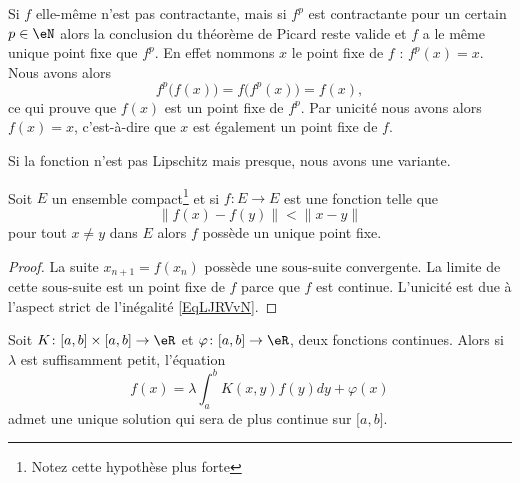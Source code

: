 \begin{remark}  \label{remIOHUJm}
	Si \( f\) elle-même n'est pas contractante, mais si \( f^p\) est contractante pour un certain \( p\in \eN\) alors la conclusion du théorème de Picard reste valide et \( f\) a le même unique point fixe que \( f^p\). En effet nommons \( x\) le point fixe de \( f\) : \( f^p(x)=x\). Nous avons alors
	\begin{equation}
		f^p\big( f(x) \big)=f\big( f^p(x) \big)=f(x),
	\end{equation}
	ce qui prouve que \( f(x)\) est un point fixe de \( f^p\). Par unicité nous avons alors \( f(x)=x\), c'est-à-dire que \( x\) est également un point fixe de \( f\).
\end{remark}

Si la fonction n'est pas Lipschitz mais presque, nous avons une variante.
\begin{proposition}
	Soit \( E\) un ensemble compact\footnote{Notez cette hypothèse plus forte} et si \( f\colon E\to E\) est une fonction telle que
	\begin{equation}        \label{EqLJRVvN}
		\| f(x)-f(y) \|< \| x-y \|
	\end{equation}
	pour tout \( x\neq y\) dans \( E\) alors \( f\) possède un unique point fixe.
\end{proposition}

\begin{proof}
	La suite \( x_{n+1}=f(x_n)\) possède une sous-suite convergente. La limite de cette sous-suite est un point fixe de \( f\) parce que \( f\) est continue. L'unicité est due à l'aspect strict de l'inégalité \eqref{EqLJRVvN}.
\end{proof}

\begin{theorem}     \label{ThoagJPZJ}
	Soit \( K\colon \mathopen[ a , b \mathclose]\times \mathopen[ a , b \mathclose]\to \eR\) et \( \varphi\colon \mathopen[ a , b \mathclose]\to \eR\), deux fonctions continues. Alors si \( \lambda\) est suffisamment petit, l'équation
	\begin{equation}
		f(x)=\lambda\int_a^bK(x,y)f(y)dy+\varphi(x)
	\end{equation}
	admet une unique solution qui sera de plus continue sur \( \mathopen[ a , b \mathclose]\).
\end{theorem}

